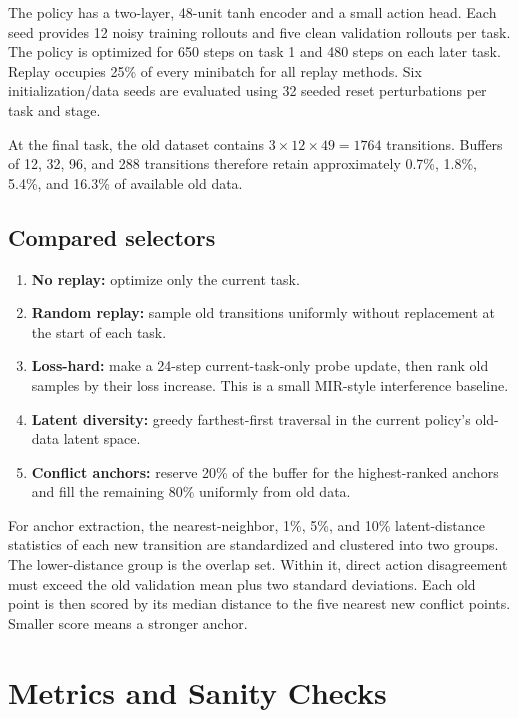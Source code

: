 \documentclass[11pt]{article}
\begin{document}
The policy has a two-layer, 48-unit tanh encoder and a small action head. Each seed provides 12 noisy training rollouts and five clean validation rollouts per task. The policy is optimized for 650 steps on task 1 and 480 steps on each later task. Replay occupies 25\% of every minibatch for all replay methods. Six initialization/data seeds are evaluated using 32 seeded reset perturbations per task and stage.

At the final task, the old dataset contains $3\times12\times49=1764$ transitions. Buffers of 12, 32, 96, and 288 transitions therefore retain approximately 0.7\%, 1.8\%, 5.4\%, and 16.3\% of available old data.

\subsection{Compared selectors}

\begin{enumerate}[leftmargin=1.5em]
  \item \textbf{No replay:} optimize only the current task.
  \item \textbf{Random replay:} sample old transitions uniformly without replacement at the start of each task.
  \item \textbf{Loss-hard:} make a 24-step current-task-only probe update, then rank old samples by their loss increase. This is a small MIR-style interference baseline.
  \item \textbf{Latent diversity:} greedy farthest-first traversal in the current policy's old-data latent space.
  \item \textbf{Conflict anchors:} reserve 20\% of the buffer for the highest-ranked anchors and fill the remaining 80\% uniformly from old data.
\end{enumerate}

For anchor extraction, the nearest-neighbor, 1\%, 5\%, and 10\% latent-distance statistics of each new transition are standardized and clustered into two groups. The lower-distance group is the overlap set. Within it, direct action disagreement must exceed the old validation mean plus two standard deviations. Each old point is then scored by its median distance to the five nearest new conflict points. Smaller score means a stronger anchor.

\section{Metrics and Sanity Checks}
\end{document}
